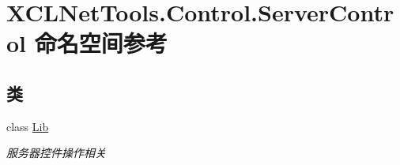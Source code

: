 \hypertarget{namespace_x_c_l_net_tools_1_1_control_1_1_server_control}{}\section{X\+C\+L\+Net\+Tools.\+Control.\+Server\+Control 命名空间参考}
\label{namespace_x_c_l_net_tools_1_1_control_1_1_server_control}
\subsection*{类}
\begin{DoxyCompactItemize}
\item 
class \hyperlink{class_x_c_l_net_tools_1_1_control_1_1_server_control_1_1_lib}{Lib}
\begin{DoxyCompactList}\small\item\em 服务器控件操作相关 \end{DoxyCompactList}\end{DoxyCompactItemize}
